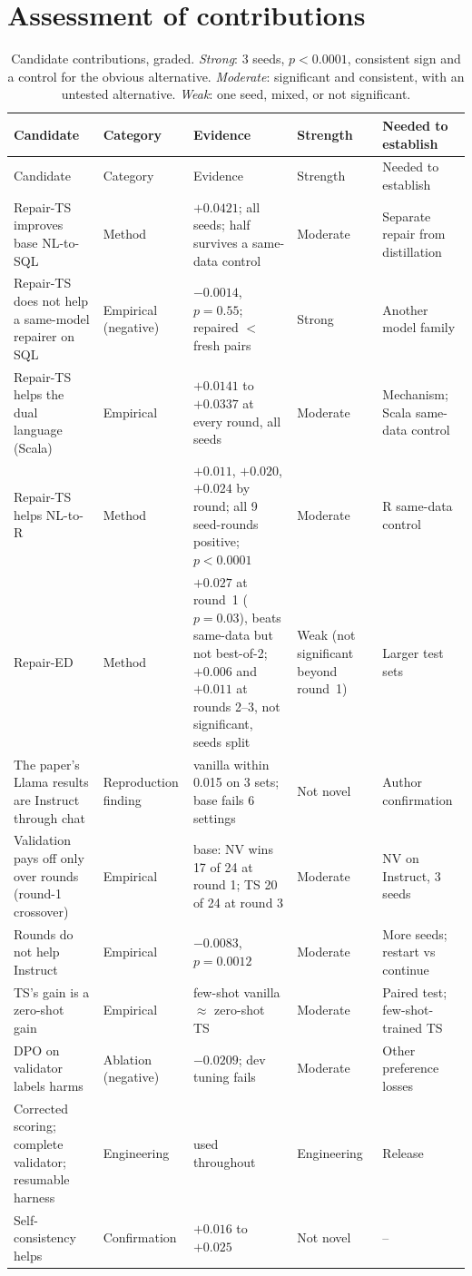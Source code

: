 \section{Assessment of contributions}\label{sec:novelty}

{\small
{}
\begin{longtable}{@{}p{3.9cm}p{2.1cm}p{4.3cm}p{1.5cm}p{2.3cm}@{}}
\caption{Candidate contributions, graded. \emph{Strong}: 3 seeds, $p<0.0001$, consistent sign and a control for the
obvious alternative. \emph{Moderate}: significant and consistent, with an untested alternative. \emph{Weak}: one seed,
mixed, or not significant.}\label{tab:novelty}\\
\toprule\rowcolor{headshade}Candidate & Category & Evidence & Strength & Needed to establish\\\midrule\endfirsthead
\toprule\rowcolor{headshade}Candidate & Category & Evidence & Strength & Needed to establish\\\midrule\endhead
\bottomrule\endfoot
Repair-TS improves base NL-to-SQL & Method & $+0.0421$; all seeds; half survives a same-data control & Moderate &
Separate repair from distillation\\
Repair-TS does not help a same-model repairer on SQL & Empirical (negative) & $-0.0014$, $p=0.55$; repaired $<$ fresh
pairs & Strong & Another model family\\
Repair-TS helps the dual language (Scala) & Empirical & $+0.0141$ to $+0.0337$ at every round, all seeds & Moderate &
Mechanism; Scala same-data control\\
Repair-TS helps NL-to-R & Method & $+0.011$, $+0.020$, $+0.024$ by round; all 9 seed-rounds positive; $p<0.0001$ &
Moderate & R same-data control\\
Repair-ED & Method & $+0.027$ at round~1 ($p=0.03$), beats same-data but not best-of-2; $+0.006$ and $+0.011$ at rounds 2--3, not significant, seeds split & Weak (not
significant beyond round~1) & Larger test sets\\
The paper's Llama results are Instruct through chat & Reproduction finding & vanilla within 0.015 on 3 sets; base fails
6 settings & Not novel & Author confirmation\\
Validation pays off only over rounds (round-1 crossover) & Empirical & base: NV wins 17 of 24 at round 1; TS 20 of 24
at round 3 & Moderate & NV on Instruct, 3 seeds\\
Rounds do not help Instruct & Empirical & $-0.0083$, $p=0.0012$ & Moderate & More seeds; restart vs continue\\
TS's gain is a zero-shot gain & Empirical & few-shot vanilla $\approx$ zero-shot TS & Moderate & Paired test;
few-shot-trained TS\\
DPO on validator labels harms & Ablation (negative) & $-0.0209$; dev tuning fails & Moderate & Other preference
losses\\
Corrected scoring; complete validator; resumable harness & Engineering & used throughout & Engineering & Release\\
Self-consistency helps & Confirmation & $+0.016$ to $+0.025$ & Not novel & --\\
\end{longtable}
}

